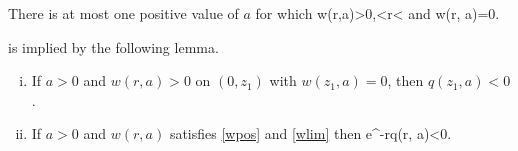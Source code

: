 \begin{theorem}\label{uniqthm}
There is at most one positive value of $a$ for which
\be\label{wpos}w(r,a)>0,<r<\infty\ee
and
\be\label{wlim} w(r, a)=0.\ee
\end{theorem}

 is implied by the following lemma.

\begin{lemma}\label{qneglem}
    \begin{enumerate}[(i)]
        \item If $a>0$ and $w(r, a)>0$ on $(0, z_1)$ with $w(z_1, a)=0$, then
            $q(z_1, a)<0$.
        \item If $a>0$ and $w(r, a)$ satisfies \eqref{wpos} and \eqref{wlim} then
            \be\label{qexplim}
                 e^{-r}q(r, a)<0.
            \ee
    \end{enumerate}
\end{lemma}

